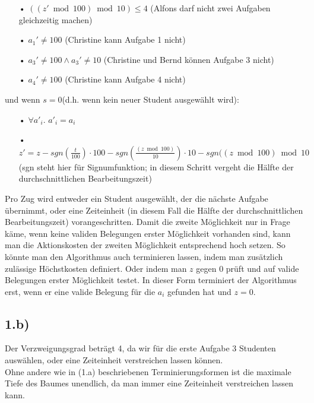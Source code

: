 \documentclass[a4paper]{article}
\begin{document}
\begin{itemize}
\begin{itemize}
    	\item[•] $((z' \bmod 100) \bmod 10)\leq 4$ \qquad (Alfons darf nicht zwei Aufgaben gleichzeitig machen)  	
  	
    	\item[•] $a_1' \neq 100$ \qquad (Christine kann Aufgabe 1 nicht)
    	
    	\item[•] $a_3' \neq 100 \wedge a_3' \neq 10$ \qquad (Christine und Bernd können Aufgabe 3 nicht)
    	
    	\item[•] $a_4' \neq 100$ \qquad (Christine kann Aufgabe 4 nicht)
    	\end{itemize}
    und wenn $s = 0$(d.h. wenn kein neuer Student ausgewählt wird):
    	\begin{itemize}%
    	
    	\item[•] $\forall a'_i$. $a'_i=a_i$
    	
    	\item[•] $z' = z-sgn(\frac{t}{100})\cdot 100-sgn(\frac{(z \bmod 100)}{10})\cdot 10 - sgn((z \bmod 100) \bmod 10$ \qquad (sgn steht hier für Signumfunktion; in diesem Schritt vergeht die Hälfte der durchschnittlichen Bearbeitungszeit)
    	\end{itemize}
    \end{itemize}
    
Pro Zug wird entweder ein Student ausgewählt, der die nächste Aufgabe übernimmt, oder eine Zeiteinheit (in diesem Fall die Hälfte der durchschnittlichen Bearbeitungszeit) vorangeschritten. Damit die zweite Möglichkeit nur in Frage käme, wenn keine validen Belegungen erster Möglichkeit vorhanden sind, kann man die Aktionskosten der zweiten Möglichkeit entsprechend hoch setzen. So könnte man den Algorithmus auch terminieren lassen, indem man zusätzlich zulässige Höchstkosten definiert. Oder indem man $z$ gegen $0$ prüft und auf valide Belegungen erster Möglichkeit testet. In dieser Form terminiert der Algorithmus erst, wenn er eine valide Belegung für die $a_i$ gefunden hat und $z=0$.

\subsection*{1.b)}   
Der Verzweigungsgrad beträgt 4, da wir für die erste Aufgabe 3 Studenten auswählen, oder eine Zeiteinheit verstreichen lassen können.\\
Ohne andere wie in (1.a) beschriebenen Terminierungsformen ist die maximale Tiefe des Baumes unendlich, da man immer eine Zeiteinheit verstreichen lassen kann.
    
\end{document}
